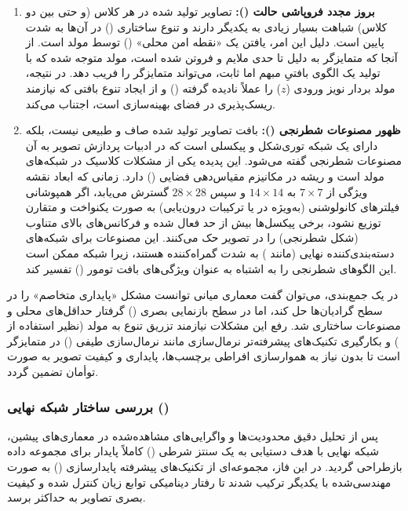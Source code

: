 \documentclass{article}
\begin{document}
\begin{enumerate}
	\item \textbf{بروز مجدد فروپاشی حالت ():}
	تصاویر تولید شده در هر کلاس (و حتی بین دو کلاس) شباهت بسیار زیادی به یکدیگر دارند و تنوع ساختاری () در آن‌ها به شدت پایین است. دلیل این امر، یافتن یک «نقطه امن محلی» () توسط مولد است. از آنجا که متمایزگر به دلیل  تا حدی ملایم و فروتن شده است، مولد متوجه شده که با تولید یک الگوی بافتیِ مبهم اما ثابت، می‌تواند متمایزگر را فریب دهد. در نتیجه، مولد بردار نویز ورودی ($z$) را عملاً نادیده گرفته () و از ایجاد تنوع بافتی که نیازمند ریسک‌پذیری در فضای بهینه‌سازی است، اجتناب می‌کند.
	
	\item \textbf{ظهور مصنوعات شطرنجی ():}
	بافت تصاویر تولید شده صاف و طبیعی نیست، بلکه دارای یک شبکه توری‌شکل و پیکسلی است که در ادبیات پردازش تصویر به آن مصنوعات شطرنجی گفته می‌شود. این پدیده یکی از مشکلات کلاسیک در شبکه‌های مولد است و ریشه در مکانیزم مقیاس‌دهی فضایی () دارد. زمانی که ابعاد نقشه ویژگی از $7 \times 7$ به $14 \times 14$ و سپس $28 \times 28$ گسترش می‌یابد، اگر همپوشانی فیلترهای کانولوشنی (به‌ویژه در  یا ترکیبات درون‌یابی) به صورت یکنواخت و متقارن توزیع نشود، برخی پیکسل‌ها بیش از حد فعال شده و فرکانس‌های بالای متناوب (شکل شطرنجی) را در تصویر حک می‌کنند. این مصنوعات برای شبکه‌های دسته‌بندی‌کننده نهایی (مانند ) به شدت گمراه‌کننده هستند، زیرا شبکه ممکن است این الگوهای شطرنجی را به اشتباه به عنوان ویژگی‌های بافت تومور () تفسیر کند.
\end{enumerate}

در یک جمع‌بندی، می‌توان گفت معماری میانی توانست مشکل «پایداری متخاصم» را در سطح گرادیان‌ها حل کند، اما در سطح بازنمایی بصری () گرفتار حداقل‌های محلی و مصنوعات ساختاری شد. رفع این مشکلات نیازمند تزریق تنوع به مولد (نظیر استفاده از ) و بکارگیری تکنیک‌های پیشرفته‌تر نرمال‌سازی مانند نرمال‌سازی طیفی () در متمایزگر است تا بدون نیاز به هموارسازی افراطی برچسب‌ها، پایداری و کیفیت تصویر به صورت توأمان تضمین گردد.

\subsubsection{بررسی ساختار شبکه نهایی ()}

پس از تحلیل دقیق محدودیت‌ها و واگرایی‌های مشاهده‌شده در معماری‌های پیشین، شبکه نهایی با هدف دستیابی به یک سنتز شرطی () کاملاً پایدار برای مجموعه داده  بازطراحی گردید. در این فاز، مجموعه‌ای از تکنیک‌های پیشرفته پایدارسازی () به صورت مهندسی‌شده با یکدیگر ترکیب شدند تا رفتار دینامیکی توابع زیان کنترل شده و کیفیت بصری تصاویر به حداکثر برسد. 
\end{document}
